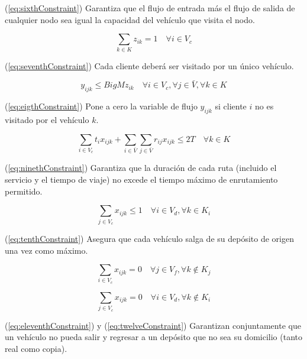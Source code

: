 \documentclass[letter, 10pt]{article}
\begin{document}
(\ref{eq:sixthConstraint}) Garantiza que el flujo de entrada más el flujo de salida de cualquier nodo sea igual la capacidad del vehículo que visita el nodo.

\begin{equation}
    \label{eq:seventhConstraint}
    \sum_{k \in K}{z_{ik}} = 1 \quad \forall i \in V_{c}
\end{equation}

(\ref{eq:seventhConstraint}) Cada cliente deberá ser visitado por un único vehículo.

\begin{equation}
    \label{eq:eigthConstraint}
    y_{ijk} \leq BigMz_{ik} \quad \forall i \in V_{c}, \forall j \in \bar{V}, \forall k \in K
\end{equation}

(\ref{eq:eigthConstraint}) Pone a cero la variable de flujo  $y_{ijk}$ si cliente $i$ no es visitado por el vehículo $k$.

\begin{equation}
    \label{eq:ninethConstraint}
    \sum_{i \in V_{c}}{t_{i}x_{ijk}} + \sum_{i \in \bar{V}} \sum_{j \in \bar{V}}{r_{ij}x_{ijk}} \leq 2T \quad \forall k \in K
\end{equation}

(\ref{eq:ninethConstraint}) Garantiza que la duración de cada ruta (incluido el servicio y el tiempo de viaje) no excede el tiempo máximo de enrutamiento permitido.

\begin{equation}
    \label{eq:tenthConstraint}
    \sum_{j \in V_{c}}{x_{ijk}} \leq 1 \quad \forall i \in V_{d}, \forall k \in K_{i}
\end{equation}

(\ref{eq:tenthConstraint}) Asegura que cada vehículo salga de su depósito de origen una vez como máximo.

\begin{equation}
    \label{eq:eleventhConstraint}
    \sum_{i \in V_{c}}{x_{ijk}} = 0 \quad \forall j \in V_{f}, \forall k \notin K_{j}
\end{equation}

\begin{equation}
    \label{eq:twelveConstraint}
    \sum_{j \in V_{c}}{x_{ijk}} = 0 \quad \forall i \in V_{d}, \forall k \notin K_{i}
\end{equation}

(\ref{eq:eleventhConstraint}) y (\ref{eq:twelveConstraint}) Garantizan conjuntamente que un vehículo no pueda salir y regresar a un depósito que no sea su domicilio (tanto real como copia).
\end{document}
